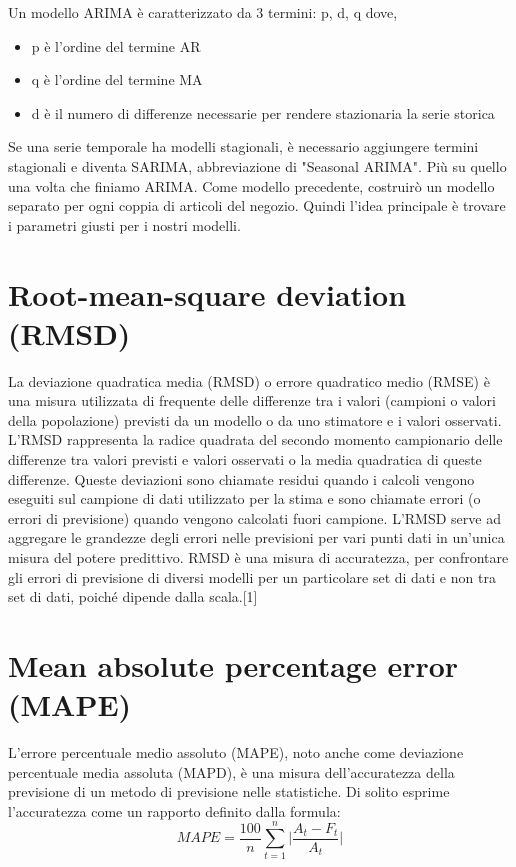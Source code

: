 \documentclass[12pt,a4paper]{report}
\begin{document}
\begin{appendices}
Un modello ARIMA è caratterizzato da 3 termini: p, d, q dove,
\begin{itemize}
    \item p è l'ordine del termine AR
    \item q è l'ordine del termine MA
    \item d è il numero di differenze necessarie per rendere stazionaria la serie storica
\end{itemize}

Se una serie temporale ha modelli stagionali, è necessario aggiungere termini stagionali e diventa SARIMA, abbreviazione di "Seasonal ARIMA". Più su quello una volta che finiamo ARIMA. Come modello precedente, costruirò un modello separato per ogni coppia di articoli del negozio. Quindi l'idea principale è trovare i parametri giusti per i nostri modelli.

\section{Root-mean-square deviation (RMSD)}
\label{appendix:RMSD}
La deviazione quadratica media (RMSD) o errore quadratico medio (RMSE) è una misura utilizzata di frequente delle differenze tra i valori (campioni o valori della popolazione) previsti da un modello o da uno stimatore e i valori osservati. L'RMSD rappresenta la radice quadrata del secondo momento campionario delle differenze tra valori previsti e valori osservati o la media quadratica di queste differenze. Queste deviazioni sono chiamate residui quando i calcoli vengono eseguiti sul campione di dati utilizzato per la stima e sono chiamate errori (o errori di previsione) quando vengono calcolati fuori campione. L'RMSD serve ad aggregare le grandezze degli errori nelle previsioni per vari punti dati in un'unica misura del potere predittivo. RMSD è una misura di accuratezza, per confrontare gli errori di previsione di diversi modelli per un particolare set di dati e non tra set di dati, poiché dipende dalla scala.[1]

\section{Mean absolute percentage error (MAPE)}
\label{appendix:MAPE}
L'errore percentuale medio assoluto (MAPE), noto anche come deviazione percentuale media assoluta (MAPD), è una misura dell'accuratezza della previsione di un metodo di previsione nelle statistiche. Di solito esprime l'accuratezza come un rapporto definito dalla formula:
\begin{equation}
    {\displaystyle MAPE = \frac{100}{n} \sum\limits_{t=1}^{n} \vert \frac{A_t - F_t}{A_t} \vert}
\end{equation}


\end{appendices}
\end{document}
